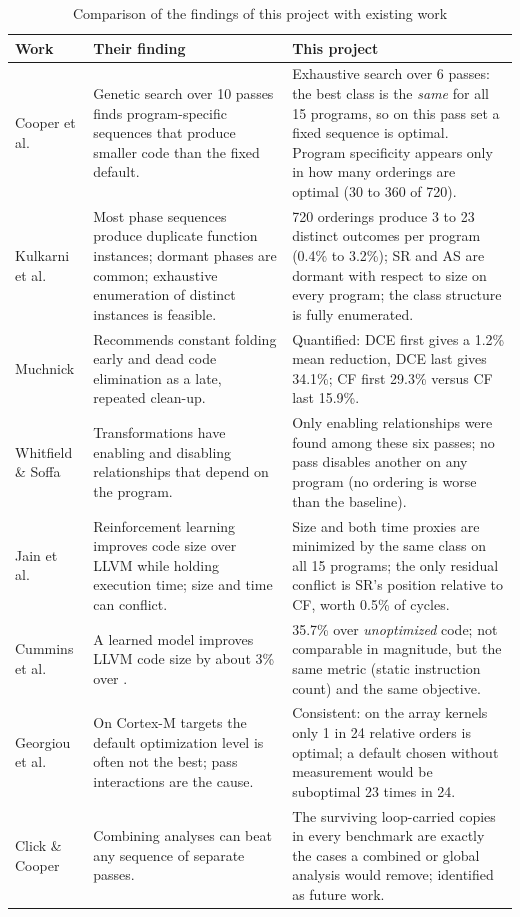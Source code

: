 \begin{table}[!htb]
\centering\small
\caption{Comparison of the findings of this project with existing work}
\label{tab:comparison}
\begin{tabular}{L{3.0cm} L{5.0cm} L{5.4cm}}
\toprule
\textbf{Work} & \textbf{Their finding} & \textbf{This project}\\
\midrule
Cooper et al.\ \cite{cooper1999} & Genetic search over 10 passes finds program-specific sequences that produce smaller code than the fixed default. & Exhaustive search over 6 passes: the best class is the \emph{same} for all 15 programs, so on this pass set a fixed sequence is optimal. Program specificity appears only in how many orderings are optimal (30 to 360 of 720).\\
Kulkarni et al.\ \cite{kulkarni2004,kulkarni2006} & Most phase sequences produce duplicate function instances; dormant phases are common; exhaustive enumeration of distinct instances is feasible. & 720 orderings produce 3 to 23 distinct outcomes per program (0.4\% to 3.2\%); SR and AS are dormant with respect to size on every program; the class structure is fully enumerated.\\
Muchnick \cite{muchnick1997} & Recommends constant folding early and dead code elimination as a late, repeated clean-up. & Quantified: DCE first gives a 1.2\% mean reduction, DCE last gives 34.1\%; CF first 29.3\% versus CF last 15.9\%.\\
Whitfield \& Soffa \cite{whitfield1997} & Transformations have enabling and disabling relationships that depend on the program. & Only enabling relationships were found among these six passes; no pass disables another on any program (no ordering is worse than the baseline).\\
Jain et al.\ \cite{jain2022} & Reinforcement learning improves code size over LLVM  while holding execution time; size and time can conflict. & Size and both time proxies are minimized by the same class on all 15 programs; the only residual conflict is SR's position relative to CF, worth 0.5\% of cycles.\\
Cummins et al.\ \cite{cummins2023} & A learned model improves LLVM code size by about 3\% over . & 35.7\% over \emph{unoptimized} code; not comparable in magnitude, but the same metric (static instruction count) and the same objective.\\
Georgiou et al.\ \cite{georgiou2018} & On Cortex-M targets the default optimization level is often not the best; pass interactions are the cause. & Consistent: on the array kernels only 1 in 24 relative orders is optimal; a default chosen without measurement would be suboptimal 23 times in 24.\\
Click \& Cooper \cite{click1995} & Combining analyses can beat any sequence of separate passes. & The surviving loop-carried copies in every benchmark are exactly the cases a combined or global analysis would remove; identified as future work.\\
\bottomrule
\end{tabular}
\end{table}

